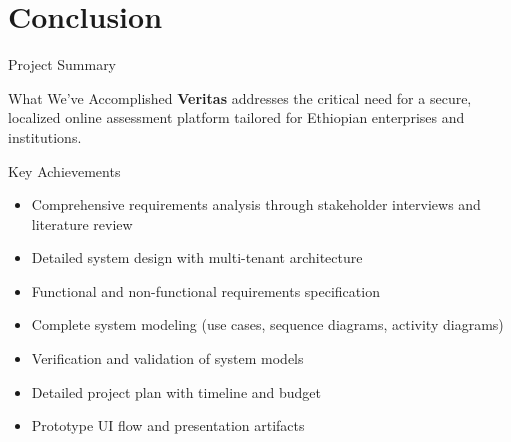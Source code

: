 \section{Conclusion}

\begin{frame}{Project Summary}
    \begin{block}{What We've Accomplished}
        \textbf{Veritas} addresses the critical need for a secure, localized online assessment platform tailored for Ethiopian enterprises and institutions.
    \end{block}
    
    \begin{block}{Key Achievements}
        \begin{itemize}
            \item Comprehensive requirements analysis through stakeholder interviews and literature review
            \item Detailed system design with multi-tenant architecture
            \item Functional and non-functional requirements specification
            \item Complete system modeling (use cases, sequence diagrams, activity diagrams)
            \item Verification and validation of system models
            \item Detailed project plan with timeline and budget
            \item Prototype UI flow and presentation artifacts
        \end{itemize}
    \end{block}
\end{frame}

